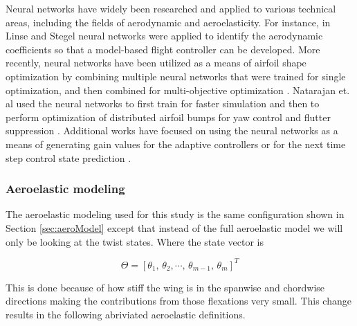 \documentclass[11pt]{ucthesis}
\begin{document}
Neural networks have widely been researched and applied to various technical areas, including the fields of aerodynamic and aeroelasticity. For instance, in Linse and Stegel \cite{linse1993identification} neural networks were applied to identify the aerodynamic coefficients so that a model-based flight controller can be developed. More recently, neural networks have been utilized as a means of airfoil shape optimization by combining multiple neural networks that were trained for single optimization, and then combined for multi-objective optimization \cite{rai2000improving,rai2002towards,rai2000aerodynamic}. Natarajan et. al \cite{natarajan2004aeroelastic, natarajan2002dynamic} used the neural networks to first train for faster simulation and then to perform optimization of distributed airfoil bumps for yaw control \cite{natarajan2004aeroelastic} and flutter suppression \cite{natarajan2002dynamic}. Additional works have focused on using the neural networks as a means of generating gain values for the adaptive controllers \cite{lakshmikanth2014adaptive} or for the next time step control state prediction \cite{wang2004time}.

\subsubsection{Aeroelastic modeling}

The aeroelastic modeling used for this study is the same configuration shown in Section \ref{sec:aeroModel} except that instead of the full aeroelastic model we will only be looking at the twist states. Where the state vector is 

\begin{equation}
\Theta = [\theta_1,\,\theta_2,\dotsb,\,\theta_{m-1},\,\theta_m]^T
\label{eqn:state}
\end{equation}

This is done because of how stiff the wing is in the spanwise and chordwise directions making the contributions from those flexations very small. This change results in the following abriviated aeroelastic definitions.
\end{document}
